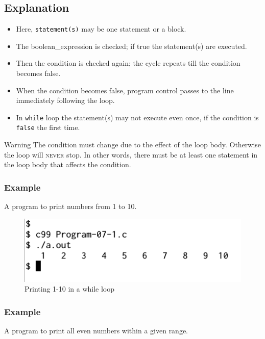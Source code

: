 \documentclass[11pt,a4paper]{article}
\begin{document}
\subsection*{Explanation}
\begin{itemize}
\item Here, \texttt{statement(s)} may be one statement or a block.
\item The boolean\_expression is checked; if true the statement(s) are executed. 
\item Then the condition is checked again; the cycle repeats till the condition becomes false.
\item When the condition becomes false,  program control passes to the line immediately following the loop.
\item In \texttt{while} loop the statement(s) may not execute even once, if the condition is \texttt{false} the first time.
\end{itemize}

\begin{bclogo}[couleur=blue!5, arrondi=0.3, logo=\bcattention]{Warning}
The condition must change due to the effect of the loop body. Otherwise the loop will \textsc{never} stop. In other words, there must be at least one statement in the loop body that affects the condition. 
\end{bclogo}

\subsubsection*{Example}

A program to print numbers from 1 to 10.


\begin{figure}[ht]
\begin{center}
\includegraphics[scale=0.6]{Output-07-1.png}
\caption{Printing 1-10 in a while loop}
\label{output-07-1}
\end{center}
\end{figure}

\subsubsection*{Example}
 A program to print all even numbers within a given range.

\end{document}
